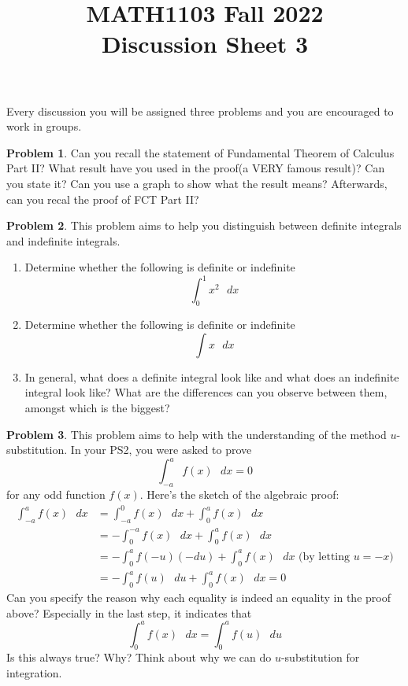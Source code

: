 \documentclass[11pt,oneside]{amsart}
\title{MATH1103 Fall 2022\\
Discussion Sheet 3}
\theoremstyle{definition}
\newtheorem{problem}{Problem}
\begin{document}
    \maketitle
    Every discussion you will be assigned three problems and you are encouraged to work in groups.

    \begin{problem}
         Can you recall the statement of Fundamental Theorem of Calculus Part II? What result have you used in the proof(a VERY famous result)? Can you state it? Can you use a graph to show what the result means? Afterwards, can you recal the proof of FCT Part II?
    \end{problem}

    \begin{problem}
       This problem aims to help you distinguish between definite integrals and indefinite integrals.
       \begin{enumerate}
           \item Determine whether the following is definite or indefinite
           $$\int_0^1 x^2 \text{ }dx$$
           \item Determine whether the following is definite or indefinite
           $$\int x \text{ }dx
           $$
           \item In general, what does a definite integral look like and what does an indefinite integral look like? What are the differences can you observe between them, amongst which is the biggest?
       \end{enumerate}
       
       
       
    \end{problem}

    \begin{problem}
       This problem aims to help with the understanding of the method $u$-substitution. In your PS2, you were asked to prove $$\int_{-a}^a f(x) \text{ }dx=0$$ for any odd function $f(x)$. Here's the sketch of the algebraic proof:
           $$
           \begin{aligned}
           \int_{-a}^a f(x) \text{ }dx&=\int_{-a}^ 0 f(x) \text{ }dx+\int_0^a f(x) \text{ }dx\\
           &=-\int_0^{-a} f(x) \text{ }dx+\int_0^a f(x) \text{ }dx\\
           &=-\int_0^a f(-u) (-du)+ \int_0^a f(x) \text{ }dx\text{ (by letting $u=-x$)}\\
           &=-\int_0^a f(u) \text{ }du+\int_0^a f(x) \text{ }dx=0
           \end{aligned}
           $$
        Can you specify the reason why each equality is indeed an equality in the proof above? Especially in the last step, it indicates that $$\int_0^a f(x) \text{ }dx =\int_0^a f(u) \text{ }du$$ Is this always true? Why? Think about why we can do $u$-substitution for integration.
        
    \end{problem}
\end{document}
